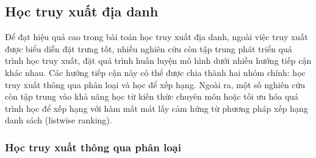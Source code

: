 \subsection{Học truy xuất địa danh}

Để đạt hiệu quả cao trong bài toán học truy xuất địa danh, ngoài việc truy xuất được biểu diễn đặt trưng tốt, nhiều nghiên cứu còn tập trung phát triển quá trình học truy xuất, đặt quá trình huấn luyện mô hình dưới nhiều hướng tiếp cận khác nhau. Các hướng tiếp cận này có thể được chia thành hai nhóm chính: học truy xuất thông qua phân loại và học để xếp hạng. Ngoài ra, một số nghiên cứu còn tập trung vào khả năng học từ kiến thức chuyên môn hoặc tối ưu hóa quá trình học để xếp hạng với hàm mất mát lấy cảm hứng từ phương pháp xếp hạng danh sách (listwise ranking).

\subsubsection{Học truy xuất thông qua phân loại}

